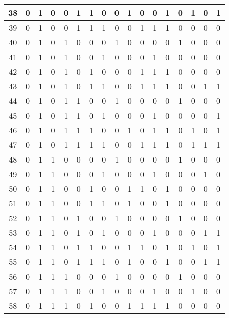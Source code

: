 \documentclass[12pt, oneside, openany]{article}
\begin{document}
{\begin{longtable}[c]{|c||c|c|c|c|c|c|c||c|c|c|c|c|c|c|c|c|}
    \hline
    38 & 0 &  1 & 0 & 0 & 1 & 1 & 0 &  0 & 1 & 0 & 0 &  1 &  0 & 1 & 0 & 1 \\
    \hline
    39 & 0 &  1 & 0 & 0 & 1 & 1 & 1 &  0 & 0 & 1 & 1 &  1 &  0 & 0 & 0 & 0 \\
    \hline
    40 & 0 &  1 & 0 & 1 & 0 & 0 & 0 &  1 & 0 & 0 & 0 &  0 &  1 & 0 & 0 & 0 \\
    \hline
    41 & 0 &  1 & 0 & 1 & 0 & 0 & 1 &  0 & 0 & 0 & 1 &  0 &  0 & 0 & 0 & 0 \\
    \hline
    42 & 0 &  1 & 0 & 1 & 0 & 1 & 0 &  0 & 0 & 1 & 1 &  1 &  0 & 0 & 0 & 0 \\
    \hline
    43 & 0 &  1 & 0 & 1 & 0 & 1 & 1 &  0 & 0 & 1 & 1 &  1 &  0 & 0 & 1 & 1 \\
    \hline
    44 & 0 &  1 & 0 & 1 & 1 & 0 & 0 &  1 & 0 & 0 & 0 &  0 &  1 & 0 & 0 & 0 \\
    \hline
    45 & 0 &  1 & 0 & 1 & 1 & 0 & 1 &  0 & 0 & 0 & 1 &  0 &  0 & 0 & 0 & 1 \\
    \hline
    46 & 0 &  1 & 0 & 1 & 1 & 1 & 0 &  0 & 1 & 0 & 1 &  1 &  0 & 1 & 0 & 1 \\
    \hline
    47 & 0 &  1 & 0 & 1 & 1 & 1 & 1 &  0 & 0 & 1 & 1 &  1 &  0 & 1 & 1 & 1 \\
    \hline
    48 & 0 &  1 & 1 & 0 & 0 & 0 & 0 &  1 & 0 & 0 & 0 &  0 &  1 & 0 & 0 & 0 \\
    \hline
    49 & 0 &  1 & 1 & 0 & 0 & 0 & 1 &  0 & 0 & 0 & 1 &  0 &  0 & 0 & 1 & 0 \\
    \hline
    50 & 0 &  1 & 1 & 0 & 0 & 1 & 0 &  0 & 1 & 1 & 0 &  1 &  0 & 0 & 0 & 0 \\
    \hline
    51 & 0 &  1 & 1 & 0 & 0 & 1 & 1 &  0 & 1 & 0 & 0 &  1 &  0 & 0 & 0 & 0 \\
    \hline
    52 & 0 &  1 & 1 & 0 & 1 & 0 & 0 &  1 & 0 & 0 & 0 &  0 &  1 & 0 & 0 & 0 \\
    \hline
    53 & 0 &  1 & 1 & 0 & 1 & 0 & 1 &  0 & 0 & 0 & 1 &  0 &  0 & 0 & 1 & 1 \\
    \hline
    54 & 0 &  1 & 1 & 0 & 1 & 1 & 0 &  0 & 1 & 1 & 0 &  1 &  0 & 1 & 0 & 1 \\
    \hline
    55 & 0 &  1 & 1 & 0 & 1 & 1 & 1 &  0 & 1 & 0 & 0 &  1 &  0 & 0 & 1 & 1 \\
    \hline
    56 & 0 &  1 & 1 & 1 & 0 & 0 & 0 &  1 & 0 & 0 & 0 &  0 &  1 & 0 & 0 & 0 \\
    \hline
    57 & 0 &  1 & 1 & 1 & 0 & 0 & 1 &  0 & 0 & 0 & 1 &  0 &  0 & 1 & 0 & 0 \\
    \hline
    58 & 0 &  1 & 1 & 1 & 0 & 1 & 0 &  0 & 1 & 1 & 1 &  1 &  0 & 0 & 0 & 0 \\

\end{longtable}}
\end{document}
